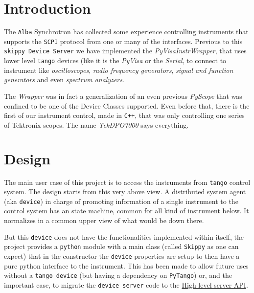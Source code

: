 \documentclass[a4paper,10pt]{article}
\begin{document}
\tableofcontents

\section{Introduction}

The \texttt{Alba} Synchrotron has collected some experience controlling instruments that supports the \texttt{SCPI} protocol from one or many of the interfaces. Previous to this \texttt{skippy Device Server} we have implemented the \emph{PyVisaInstrWrapper}, that uses lower level \texttt{tango} devices (like it is the \emph{PyVisa} or the \emph{Serial}, to connect to instrument like \emph{oscilloscopes}, \emph{radio frequency generators}, \emph{signal and function generators} and even \emph{spectrum analyzers}.

The \emph{Wrapper} was in fact a generalization of an even previous \emph{PyScope} that was confined to be one of the Device Classes supported. Even before that, there is the first of our instrument control, made in \texttt{C++}, that was only controlling one series of Tektronix scopes. The name \emph{TekDPO7000} says everything.

\section{Design}

The main user case of this project is to access the instruments from \texttt{tango} control system. The design starts from this very above view. A distributed system agent (aka \texttt{device}) in charge of promoting information of a single instrument to the control system has an state machine, common for all kind of instrument below. It normalizes in a common upper view of what would be down there.

But this \texttt{device} does not have the functionalities implemented within itself, the project provides a \texttt{python} module with a main class (called \texttt{Skippy} as one can expect) that in the constructor the \texttt{device} properties are setup to then have a pure python interface to the instrument. This has been made to allow future uses without a \texttt{tango device} (but having a dependency on \texttt{PyTango}) or, and the important case, to migrate the \texttt{device server} code to the \href{http://www.esrf.eu/computing/cs/tango/pytango/v816/server_api/server.html}{High level server API}.

\end{document}
